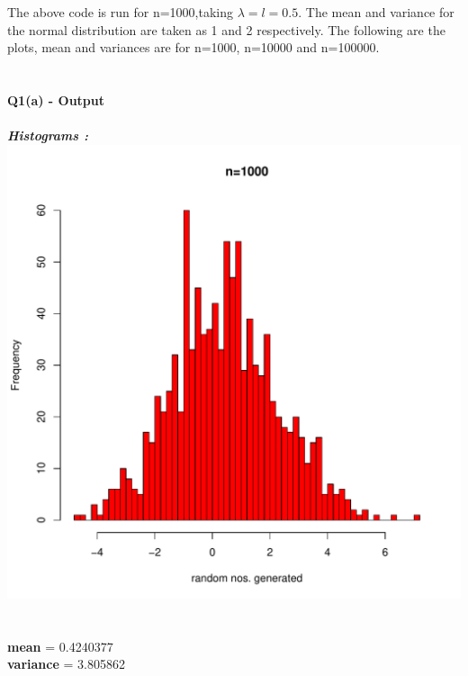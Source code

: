\documentclass{article}
\begin{document}
The  above code is run for n=1000,taking $\lambda=l=0.5$. The mean and variance for the normal distribution are taken as 1 and 2 respectively. The following are the plots, mean and variances are for n=1000, n=10000 and n=100000.\\\\\\ 
\newpage
\textbf{Q1(a) - Output}\\\\
\textbf{\textit{Histograms :}}\\
\includegraphics[scale=0.85]{Q1(1).pdf}\\\\
\\
\textbf{mean} = 0.4240377\\
\textbf{variance} = 3.805862\\
\newpage
\end{document}
